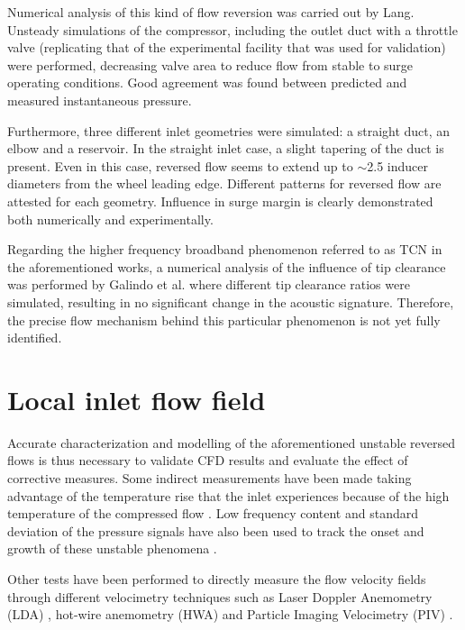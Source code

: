 Numerical analysis of this kind of flow reversion was carried out by Lang\cite{lang2011contribucion}. Unsteady simulations of the compressor, including the outlet duct with a throttle valve (replicating that of the experimental facility that was used for validation) were performed, decreasing valve area to reduce flow from stable to surge operating conditions. Good agreement was found between predicted and measured instantaneous pressure. 

Furthermore, three different inlet geometries were simulated: a straight duct, an elbow and a reservoir. In the straight inlet case, a slight tapering of the duct is present. Even in this case, reversed flow seems to extend up to $\sim$2.5 inducer diameters from the wheel leading edge. Different patterns for reversed flow are attested for each geometry. Influence in surge margin is clearly demonstrated both numerically and experimentally.

Regarding the higher frequency broadband phenomenon referred to as TCN in the aforementioned works, a numerical analysis of the influence of tip clearance was performed by Galindo et al. \cite{galindo2014influence} where different tip clearance ratios were simulated, resulting in no significant change in the acoustic signature. Therefore, the precise flow mechanism behind this particular phenomenon is not yet fully identified.

\section{Local inlet flow field}
\label{sec:liter_local_flow}

Accurate characterization and modelling of the aforementioned unstable reversed flows is thus necessary to validate CFD results and evaluate the effect of corrective measures. Some indirect measurements have been made taking advantage of the temperature rise that the inlet experiences because of the high temperature of the compressed flow \cite{andersen2009surge,figurella2014noise}. Low frequency content and standard deviation of the pressure signals have also been used to track the onset and growth of these unstable phenomena \cite{liu2013methods}.

Other tests have been performed to directly measure the flow velocity fields through different velocimetry techniques such as Laser Doppler Anemometry (LDA) \cite{pedersen2003flow}, hot-wire anemometry (HWA) \cite{oro2009forced,kalpakli2015combined} and Particle Imaging Velocimetry (PIV) \cite{wernet2000development,liu2006application,pedersen2003flow}.

